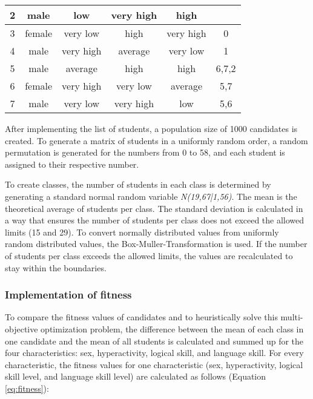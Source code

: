 \begin{onehalfspace}
\begin{table} [H]
\begin{tabular}{c|c|c|c|c|c}
        2 &  male & low & very high &  high &    \\ \hline 
        
        3 &  female & very low & high & very high & 0   \\ \hline 
        
        4 &  male & very high & average & very low & 1   \\ \hline  

        5 &  male & average & high & high & 6,7,2   \\ \hline
        
        6 &  female & very high & very low & average & 5,7   \\ \hline
        
        7 &  male & very low &very high & low & 5,6   \\ \hline
        
        
    \end{tabular}
\end{table}
After implementing the list of students,  a population size of 1000 candidates is created. To generate a matrix of students in a uniformly random order, a random permutation is generated for the numbers from 0 to 58, and each student is assigned to their respective number. 


To create classes, the number of students in each class is determined by generating a standard normal random variable \textit{N(19,67|1,56)}. The mean is the theoretical average of students per class. The standard deviation is calculated in a way that ensures the number of students per class does not exceed the allowed limits (15 and 29). To convert normally distributed values from uniformly random distributed values, the Box-Muller-Transformation is used. If the number of students per class exceeds the allowed limits, the values are recalculated to stay within the boundaries. 


\subsubsection{Implementation of fitness}
To compare the fitness values of candidates and to heuristically solve this multi-objective optimization problem, the difference between the mean of each class in one candidate and the mean of all students is calculated and summed up for the four characteristics: sex, hyperactivity, logical skill, and language skill. For every characteristic, the 
fitness values for one characteristic (sex, hyperactivity, logical skill level, and language skill level) are calculated as follows (Equation \ref{eq:fitness}):


\end{onehalfspace}
